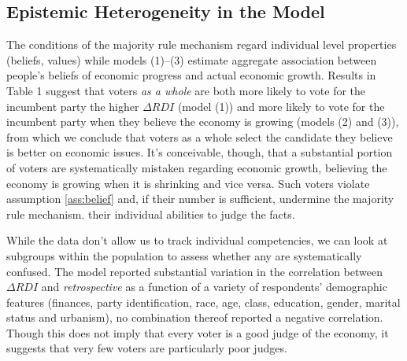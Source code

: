 \documentclass[11pt]{article}
\begin{document}
\subsection{Epistemic Heterogeneity in the Model}\label{sec:heterogeneity}
The conditions of the majority rule mechanism regard individual level
properties (beliefs, values) while  models (1)--(3) estimate
aggregate association between people's beliefs of economic progress
and actual economic growth. Results in Table 1 suggest that voters \emph{as a whole} are both more likely to vote
for the incumbent party the higher $\Delta RDI$ (model (1)) and more
likely to vote for the incumbent party when they believe the economy
is growing (models (2) and (3)), from which we conclude that voters as
a whole select the candidate they believe is better on economic
issues. It's conceivable, though, that a substantial portion of voters are
systematically mistaken regarding economic growth, believing the
economy is growing when it is shrinking and vice versa. 
Such voters violate assumption \ref{ass:belief} and, if their number
is sufficient, undermine the majority rule mechanism.
their individual abilities to judge the facts.

While the data don't allow us to track individual competencies, we can look at subgroups within the population to assess whether any are systematically confused.
The model reported substantial variation in the correlation between
$\Delta RDI$ and \emph{retrospective} as a function of a variety of respondents'  demographic features (finances, party identification, race, age, class, education, gender, marital status and urbanism), no combination thereof  reported a negative correlation.
Though this does not imply that every voter is a good judge of the
economy, it suggests that very few voters are particularly poor
judges. 
\end{document}
